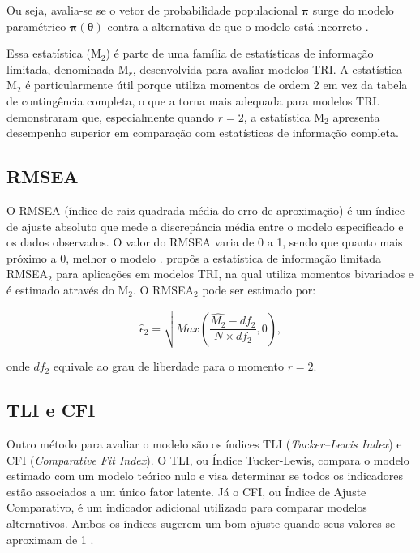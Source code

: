 Ou seja, avalia-se se o vetor de probabilidade populacional $\boldsymbol{\pi}$ surge do modelo paramétrico $\boldsymbol{\pi}(\boldsymbol{\theta})$ contra a alternativa de que o modelo está incorreto \cite{maydeu2006limited}.

Essa estatística (M$_2$) é parte de uma família de estatísticas de informação limitada, denominada M$_r$, desenvolvida para avaliar modelos TRI. A estatística M$_2$ é particularmente útil porque utiliza momentos de ordem 2 em vez da tabela de contingência completa, o que a torna mais adequada para modelos TRI.  demonstraram que, especialmente quando $r=2$, a estatística M$_2$ apresenta desempenho superior em comparação com estatísticas de informação completa. 

\subsection{RMSEA}

O RMSEA (índice de raiz quadrada média do erro de aproximação) é um índice de ajuste absoluto que mede a discrepância média entre o modelo especificado e os dados observados. O valor do RMSEA varia de 0 a 1, sendo que quanto mais próximo a 0, melhor o modelo \cite{kline2016principles}.  propôs a estatística de informação limitada RMSEA$_{2}$ para aplicações em modelos TRI, na qual utiliza momentos bivariados e é estimado através do M$_2$. O RMSEA$_2$ pode ser estimado por:

\[
\hat{\epsilon}_2 = \sqrt{Max\left(\frac{\hat{M_{2}} - df_{2}}
	{N \times df_{2}}, 0 \right) } ,
\]

\noindent onde $df_2$ equivale ao grau de liberdade para o momento $r = 2$.

\subsection{TLI e CFI}

Outro método para avaliar o modelo são os índices TLI (\textit{Tucker–Lewis Index}) e CFI (\textit{Comparative Fit Index}). O TLI, ou Índice Tucker-Lewis, compara o modelo estimado com um modelo teórico nulo e visa determinar se todos os indicadores estão associados a um único fator latente. Já o CFI, ou Índice de Ajuste Comparativo, é um indicador adicional utilizado para comparar modelos alternativos. Ambos os índices sugerem um bom ajuste quando seus valores se aproximam de 1 \cite{hair2009multivariada}.







